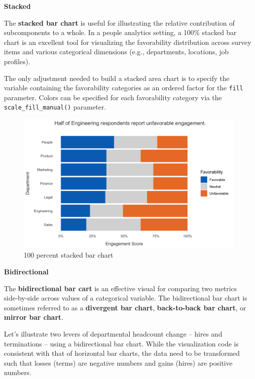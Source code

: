 \documentclass[
]{book}
\begin{document}
\textbf{Stacked}

The \textbf{stacked bar chart} is useful for illustrating the relative contribution of subcomponents to a whole. In a people analytics setting, a 100\% stacked bar chart is an excellent tool for visualizing the favorability distribution across survey items and various categorical dimensions (e.g., departments, locations, job profiles).

The only adjustment needed to build a stacked area chart is to specify the variable containing the favorability categories as an ordered factor for the \texttt{fill} parameter. Colors can be specified for each favorability category via the \texttt{scale\_fill\_manual()} parameter.

\begin{figure}

{\centering \includegraphics[width=1\linewidth]{graphics/stacked_bar_chart} 

}

\caption{100 percent stacked bar chart}\label{fig:sbar-chart}
\end{figure}

\textbf{Bidirectional}

The \textbf{bidirectional bar cart} is an effective visual for comparing two metrics side-by-side across values of a categorical variable. The bidirectional bar chart is sometimes referred to as a \textbf{divergent bar chart}, \textbf{back-to-back bar chart}, or \textbf{mirror bar chart}.

Let's illustrate two levers of departmental headcount change -- hires and terminations -- using a bidirectional bar chart. While the visualization code is consistent with that of horizontal bar charts, the data need to be transformed such that losses (terms) are negative numbers and gains (hires) are positive numbers.
\end{document}
